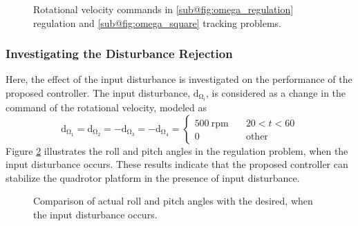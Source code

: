 \documentclass[3p]{elsarticle}
\begin{document}
\begin{figure}[H]
	\caption{Rotational velocity  commands in \ref{sub@fig:omega_regulation} regulation and \ref{sub@fig:omega_square} tracking problems.}
	\label{fig:omega}
\end{figure}
\subsubsection{Investigating the Disturbance Rejection}\label{sec:disturbance}
\noindent Here, the effect of the input disturbance is investigated on the performance of the proposed controller.
The input disturbance, $\mathrm{d_{\Omega_i}}$, is considered as a change in the command of the rotational velocity, modeled as %
\begin{equation}
	\mathrm{d_{\Omega_1}} = \mathrm{d_{\Omega_2}} = -\mathrm{d_{\Omega_3}} = -\mathrm{d_{\Omega_4}} = \begin{cases}
		500~{\mathrm{rpm}} \quad &20<t<60\\
		0 \quad &\mathrm{other}
	\end{cases}
\end{equation}
Figure \ref{fig:disturbance} illustrates the roll and pitch angles in the regulation problem, when the input disturbance occurs. These results indicate that the proposed controller can stabilize the quadrotor platform in the presence of input disturbance.



\begin{figure}[H]
	\centering
	
	\caption{Comparison of actual roll and pitch angles with the desired, when the input disturbance occurs.}
	\label{fig:disturbance}
\end{figure}
\end{document}
